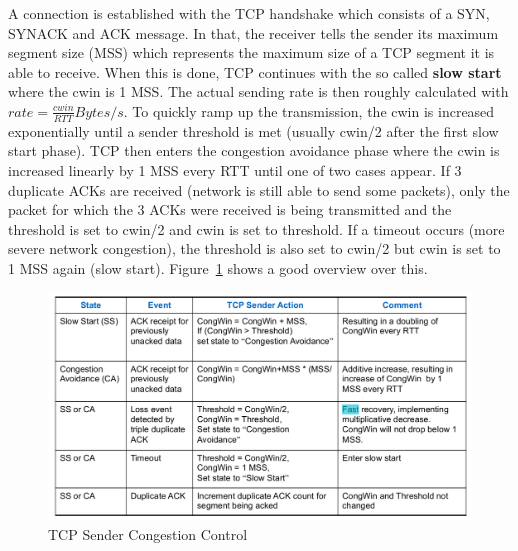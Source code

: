 A connection is established with the TCP handshake which consists of a SYN, SYNACK and ACK message.
In that, the receiver tells the sender its maximum segment size (MSS) which represents the maximum size of a TCP segment it is able to receive.
When this is done, TCP continues with the so called \textbf{slow start} where the cwin is 1 MSS.
The actual sending rate is then roughly calculated with $rate = \frac{cwin}{RTT} Bytes/s$.
To quickly ramp up the transmission, the cwin is increased exponentially until a sender threshold is met (usually cwin/2 after the first slow start phase).
TCP then enters the congestion avoidance phase where the cwin is increased linearly by 1 MSS every RTT until one of two cases appear.
If 3 duplicate ACKs are received (network is still able to send some packets), only the packet for which the 3 ACKs were received is being transmitted and the threshold is set to cwin/2 and cwin is set to threshold.
If a timeout occurs (more severe network congestion), the threshold is also set to cwin/2 but cwin is set to 1 MSS again (slow start).
Figure~\ref{fig:tcp_sender_congestion_control} shows a good overview over this.
\begin{figure}[h]
  \centering
  \includegraphics[width=.8\textwidth]{figures/tcp_sender_congestion_control}
  \caption{TCP Sender Congestion Control}\label{fig:tcp_sender_congestion_control}
\end{figure}

